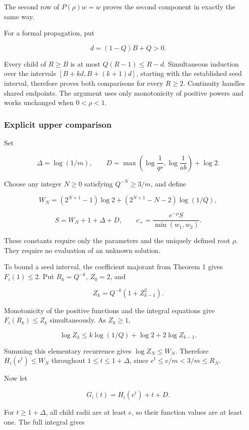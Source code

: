 The second row of \(P(\rho)w=w\) proves the second component in exactly
the same way.

For a formal propagation, put

\[
d=(1-Q)B+Q>0.
\]

Every child of \(R\ge B\) is at most \(Q(R-1)\le R-d\). Simultaneous
induction over the intervals \([B+kd,B+(k+1)d]\), starting with the
established seed interval, therefore proves both comparisons for every
\(R\ge2\). Continuity handles shared endpoints. The argument uses only
monotonicity of positive powers and works unchanged when \(0<\rho<1\).

\hypertarget{v11-coupled_growth_full-explicit-upper-comparison}{%
\subsubsection{Explicit upper
comparison}\label{v11-coupled_growth_full-explicit-upper-comparison}}

Set

\[
\Delta=\log(1/m),\qquad
D=\max\left(\log\frac1{qr},\log\frac1{ab}\right)+\log2.
\]

Choose any integer \(N\ge0\) satisfying \(Q^{-N}\ge3/m\), and define

\[
W_N=(2^{N+1}-1)\log2
 +(2^{N+1}-N-2)\log(1/Q),
\]

\[
S=W_N+1+\Delta+D,\qquad
c_+=\frac{e^{-\rho}S}{\min(w_1,w_2)}.
\]

These constants require only the parameters and the uniquely defined
root \(\rho\). They require no evaluation of an unknown solution.

To bound a seed interval, the coefficient majorant from Theorem 1 gives
\(F_i(1)\le2\). Put \(R_k=Q^{-k}\), \(Z_0=2\), and

\[
Z_k=Q^{-k}(1+Z_{k-1}^2).
\]

Monotonicity of the positive functions and the integral equations give
\(F_i(R_k)\le Z_k\) simultaneously. As \(Z_k\ge1\),

\[
\log Z_k\le k\log(1/Q)+\log2+2\log Z_{k-1}.
\]

Summing this elementary recurrence gives \(\log Z_N\le W_N\). Therefore
\(H_i(e^t)\le W_N\) throughout \(1\le t\le1+\Delta\), since
\(e^t\le e/m<3/m\le R_N\).

Now let

\[
G_i(t)=H_i(e^t)+t+D.
\]

For \(t\ge1+\Delta\), all child radii are at least \(e\), so their
function values are at least one. The full integral gives

